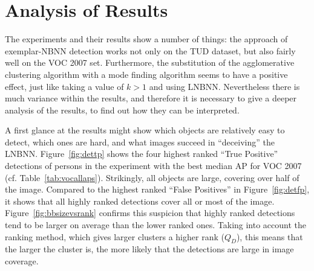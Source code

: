 \chapter{Analysis of Results} %
\label{cha:analysis_of_results}

The experiments and their results show a number of things: the approach of exemplar-NBNN detection works not only on the TUD dataset, but also fairly well on the VOC 2007 set. Furthermore, the substitution of the agglomerative clustering algorithm with a mode finding algorithm seems to have a positive effect, just like taking a value of $k>1$ and using LNBNN. Nevertheless there is much variance within the results, and therefore it is necessary to give a deeper analysis of the results, to find out how they can be interpreted.

A first glance at the results might show which objects are relatively easy to detect, which ones are hard, and what images succeed in ``deceiving'' the LNBNN. Figure~\ref{fig:dettp} shows the four highest ranked ``True Positive'' detections of persons in the experiment with the best median AP for VOC 2007 (cf. Table~\ref{tab:vocallaps}). Strikingly, all objects are large, covering over half of the image. Compared to the highest ranked ``False Positives'' in Figure~\ref{fig:detfp}, it shows that all highly ranked detections cover all or most of the image. Figure~\ref{fig:bbsizevsrank} confirms this suspicion that highly ranked detections tend to be larger on average than the lower ranked ones. Taking into account the ranking method, which gives larger clusters a higher rank ($Q_D$), this means that the larger the cluster is, the more likely that the detections are large in image coverage.

